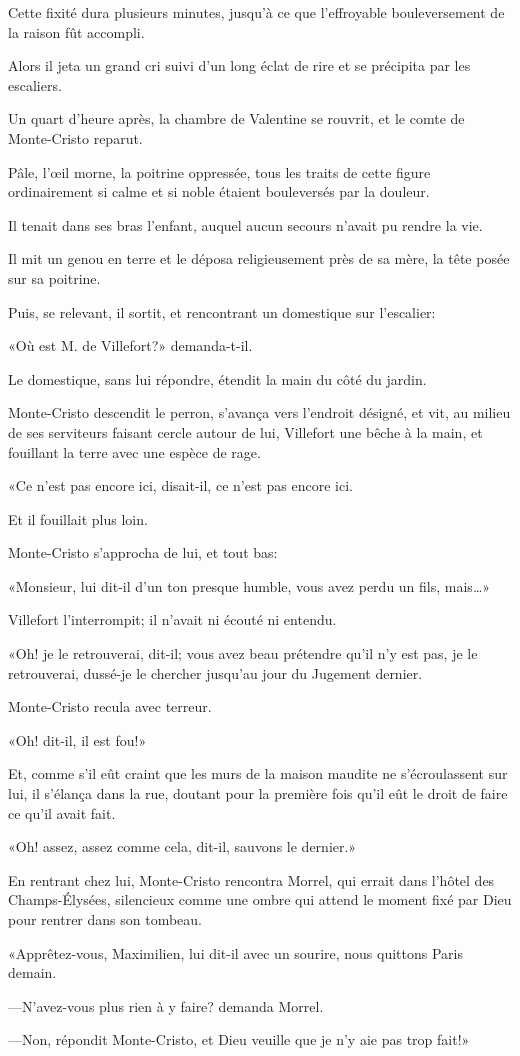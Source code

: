 Cette fixité dura plusieurs minutes, jusqu'à ce que l'effroyable bouleversement de la raison fût accompli. 

Alors il jeta un grand cri suivi d'un long éclat de rire et se précipita par les escaliers. 

Un quart d'heure après, la chambre de Valentine se rouvrit, et le comte de Monte-Cristo reparut. 

Pâle, l'œil morne, la poitrine oppressée, tous les traits de cette figure ordinairement si calme et si noble étaient bouleversés par la douleur. 

Il tenait dans ses bras l'enfant, auquel aucun secours n'avait pu rendre la vie. 

Il mit un genou en terre et le déposa religieusement près de sa mère, la tête posée sur sa poitrine. 

Puis, se relevant, il sortit, et rencontrant un domestique sur l'escalier: 

«Où est M. de Villefort?» demanda-t-il. 

Le domestique, sans lui répondre, étendit la main du côté du jardin. 

Monte-Cristo descendit le perron, s'avança vers l'endroit désigné, et vit, au milieu de ses serviteurs faisant cercle autour de lui, Villefort une bêche à la main, et fouillant la terre avec une espèce de rage. 

«Ce n'est pas encore ici, disait-il, ce n'est pas encore ici. 

Et il fouillait plus loin. 

Monte-Cristo s'approcha de lui, et tout bas: 

«Monsieur, lui dit-il d'un ton presque humble, vous avez perdu un fils, mais\dots» 

Villefort l'interrompit; il n'avait ni écouté ni entendu. 

«Oh! je le retrouverai, dit-il; vous avez beau prétendre qu'il n'y est pas, je le retrouverai, dussé-je le chercher jusqu'au jour du Jugement dernier. 

Monte-Cristo recula avec terreur. 

«Oh! dit-il, il est fou!» 

Et, comme s'il eût craint que les murs de la maison maudite ne s'écroulassent sur lui, il s'élança dans la rue, doutant pour la première fois qu'il eût le droit de faire ce qu'il avait fait. 

«Oh! assez, assez comme cela, dit-il, sauvons le dernier.» 

En rentrant chez lui, Monte-Cristo rencontra Morrel, qui errait dans l'hôtel des Champs-Élysées, silencieux comme une ombre qui attend le moment fixé par Dieu pour rentrer dans son tombeau. 

«Apprêtez-vous, Maximilien, lui dit-il avec un sourire, nous quittons Paris demain. 

—N'avez-vous plus rien à y faire? demanda Morrel. 

—Non, répondit Monte-Cristo, et Dieu veuille que je n'y aie pas trop fait!» 